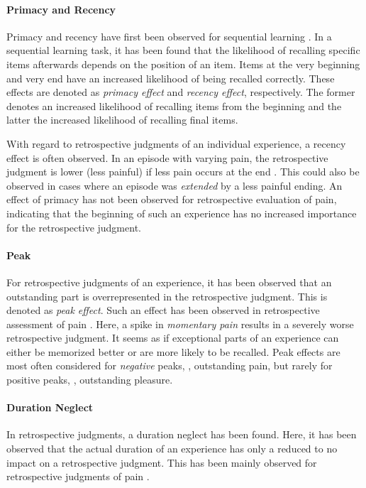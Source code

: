 \paragraph*{Primacy and Recency}
Primacy and recency have first been observed for sequential learning \citep[][]{murdock_jr._serial_1962}.
In a sequential learning task, it has been found that the likelihood of recalling specific items afterwards depends on the position of an item.
Items at the very beginning and very end have an increased likelihood of being recalled correctly.
These effects are denoted as \emph{primacy effect} and \emph{recency effect}, respectively.
The former denotes an increased likelihood of recalling items from the beginning and the latter the increased likelihood of recalling final items.

With regard to retrospective judgments of an individual experience, a recency effect is often observed.
In an episode with varying pain, the retrospective judgment is lower (less painful) if less pain occurs at the end \citep[][]{kahneman_when_1993, redelmeier_patients_1996}.
This could also be observed in cases where an episode was \emph{extended} by a less painful ending.
An effect of primacy has not been observed for retrospective evaluation of pain, indicating that the beginning of such an experience has no increased importance for the retrospective judgment.

\paragraph*{Peak}
For retrospective judgments of an experience, it has been observed that an outstanding part is overrepresented in the retrospective judgment.
This is denoted as \emph{peak effect}.
Such an effect has been observed in retrospective assessment of pain \citep[][]{kahneman_when_1993, redelmeier_patients_1996}.
Here, a spike in \emph{momentary pain} results in a severely worse retrospective judgment.
It seems as if exceptional parts of an experience can either be memorized better or are more likely to be recalled.
Peak effects are most often considered for \emph{negative} peaks, \eg, outstanding pain, but rarely for positive peaks, \eg, outstanding pleasure.

\paragraph*{Duration Neglect}
In retrospective judgments, a duration neglect has been found.
Here, it has been observed that the actual duration of an experience has only a reduced to no impact on a retrospective judgment.
This has been mainly observed for retrospective judgments of pain \citep[][]{fredrickson_duration_1993, ariely_combining_1998}.

